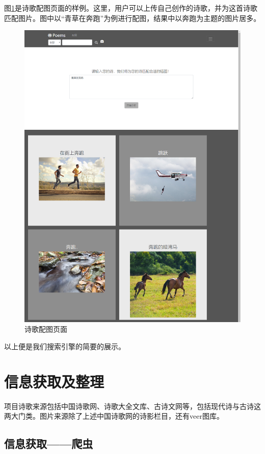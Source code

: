 \documentclass[a4paper, 10pt]{article}
\begin{document}
图\ref{fig:demo_matchimage}是诗歌配图页面的样例。这里，用户可以上传自己创作的诗歌，并为这首诗歌匹配图片。图中以“青草在奔跑”为例进行配图，结果中以奔跑为主题的图片居多。

\begin{figure}[H]
\centering
\includegraphics[scale=0.48]{fig/demo_matchimage.png}
\caption{诗歌配图页面}
\label{fig:demo_matchimage}
\end{figure}

以上便是我们搜索引擎的简要的展示。

\section{信息获取及整理}
项目诗歌来源包括中国诗歌网、诗歌大全文库、古诗文网等，包括现代诗与古诗这两大门类。图片来源除了上述中国诗歌网的诗影栏目，还有veer图库。

\subsection{信息获取——爬虫}
\end{document}
